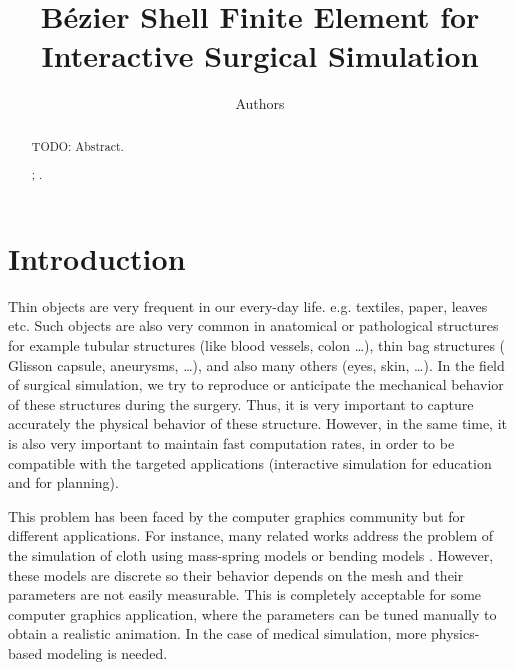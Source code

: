 \documentclass{egpubl}
\title[B\'ezier Shell FE]%
      {B\'ezier Shell Finite Element for Interactive Surgical Simulation}
\author[Authors]
       {Authors} %
\begin{document}

\maketitle

\begin{abstract} %
    TODO: Abstract.

\begin{classification} %
    ;
    .
\end{classification}

\end{abstract}






\section{Introduction} %

Thin objects are very frequent in our every-day life. %
e.g. textiles, paper, leaves etc. 
Such objects are also very common in anatomical or pathological structures for example tubular structures (like blood vessels, colon \ldots), thin bag structures (%
Glisson capsule, aneurysms,  \ldots), and also many others (eyes, skin, \ldots). 
In the field of surgical simulation, we try to reproduce or anticipate the mechanical behavior of these structures during the surgery.
Thus, it is very important to capture accurately the physical behavior of these structure.
However, in the same time, it is also very important to maintain fast computation rates, in order to be compatible with the targeted applications (interactive simulation for education and for planning).

This problem has been faced by the computer graphics community but for different applications.
For instance, many related works address the problem of the simulation of cloth using mass-spring models \cite{Volino2009} or bending models \cite{Grinspun2003}. %
However, these models are discrete so their behavior depends on the mesh and their parameters are not easily measurable.
This is completely acceptable for some computer graphics application, where the parameters can be tuned manually to obtain a realistic animation.
In the case of medical simulation, more physics-based modeling is needed.
\end{document}
